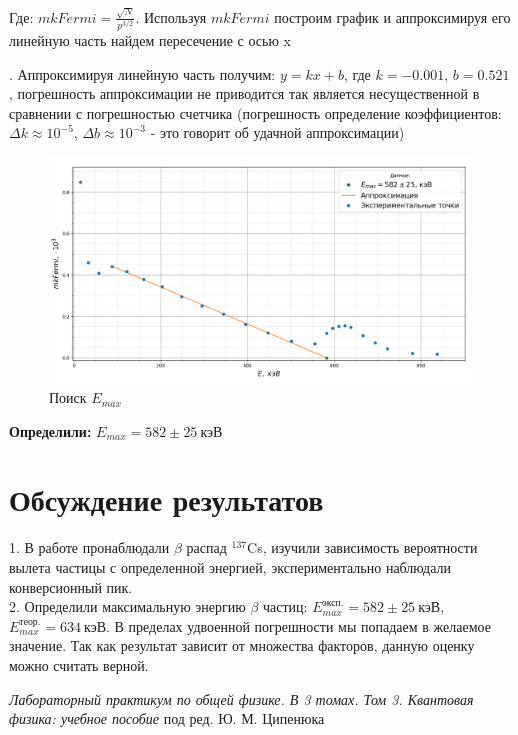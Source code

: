 \documentclass[a4paper,12pt]{article} %
\begin{document}
	\begin{center}
		Где: $mkFermi=\frac{\sqrt{N}}{p^{3/2}}$. Используя $mkFermi$ построим график и аппроксимируя его линейную часть найдем пересечение с осью x\\
	\end{center}
	. Аппроксимируя линейную часть получим: $y=kx+b$, где $k = -0.001$, $b = 0.521$, погрешность аппроксимации не приводится так является несущественной в сравнении с погрешностью счетчика (погрешность определение коэффициентов: $\Delta k \approx 10^{-5}$, $\Delta b \approx 10^{-3}$ - это говорит об удачной аппроксимации)
	\begin{figure}[H]
		\centering
		\includegraphics[width=0.9\linewidth]{graph_2}
		\caption{Поиск $E_{max}$}
		\label{fig:graph2}
	\end{figure}
	\begin{center}
	\textbf{	Определили:} $E_{max} = 582 \pm 25~\text{кэВ}$
	\end{center}
	\section{Обсуждение результатов}
	1. В работе пронаблюдали $\beta$ распад $^{137}$Cs, изучили зависимость вероятности вылета частицы с определенной  энергией, экспериментально наблюдали конверсионный пик.\\
	2. Определили максимальную энергию $\beta$ частиц: $E_{max}^{\text{эксп.}} = 582 \pm 25~\text{кэВ}$, $E_{max}^{\text{теор.}} = 634~\text{кэВ}$. В пределах удвоенной погрешности мы попадаем в желаемое значение. Так как результат зависит от множества факторов, данную оценку можно считать верной.\\
	\begin{thebibliography}{9}
		 \emph{Лабораторный практикум по общей физике. В 3 томах. Том 3. Квантовая физика: учебное пособие} под ред. Ю. М. Ципенюка
	\end{thebibliography}
	
\end{document}
